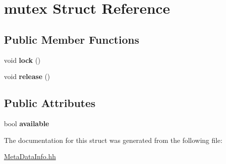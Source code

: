 \hypertarget{structmutex}{}\section{mutex Struct Reference}
\label{structmutex}
\subsection*{Public Member Functions}
\begin{DoxyCompactItemize}
\item 
void {\bfseries lock} ()\hypertarget{structmutex_a760ba333c299e9b27730051c4c794f50}{}\label{structmutex_a760ba333c299e9b27730051c4c794f50}

\item 
void {\bfseries release} ()\hypertarget{structmutex_a46a880b2944ad547ae084db92f198494}{}\label{structmutex_a46a880b2944ad547ae084db92f198494}

\end{DoxyCompactItemize}
\subsection*{Public Attributes}
\begin{DoxyCompactItemize}
\item 
bool {\bfseries available}\hypertarget{structmutex_aee1d5b4cc1a9f15ea099ff029ba22a75}{}\label{structmutex_aee1d5b4cc1a9f15ea099ff029ba22a75}

\end{DoxyCompactItemize}


The documentation for this struct was generated from the following file\+:\begin{DoxyCompactItemize}
\item 
\hyperlink{_meta_data_info_8hh}{Meta\+Data\+Info.\+hh}\end{DoxyCompactItemize}
